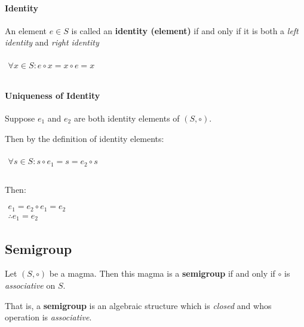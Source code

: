 \paragraph{Identity}
An element $e \in S$ is called an \textbf{identity (element)} if and
only if it is both a \textit{left identity} and \textit{right
  identity}

\begin{math}
  \begin{array}{c}
    \\
    \forall x \in S: e \circ x = x \circ e =  x\\
    \\
  \end{array}
\end{math}


\paragraph{Uniqueness of Identity}

Suppose $e_1$ and $e_2$ are both identity elements of $(S, \circ)$.

Then by the definition of identity elements:

\begin{math}
  \begin{array}{c}
    \\
    \forall s \in S: s \circ e_1 = s = e_2 \circ s\\
    \\
  \end{array}
\end{math}

Then:

\begin{math}
  \begin{array}{c}
    e_1 = e_2 \circ e_1 = e_2 \\
    \therefore e_1 = e_2
  \end{array}
\end{math}



\subsection{Semigroup}
\label{sec:semigroup}

Let $(S, \circ)$ be a magma. Then this magma is a \textbf{semigroup}
if and only if $\circ$ is \textit{associative} on $S$.


That is, a \textbf{semigroup} is an algebraic structure which is
\textit{closed} and whos operation is \textit{associative}.



